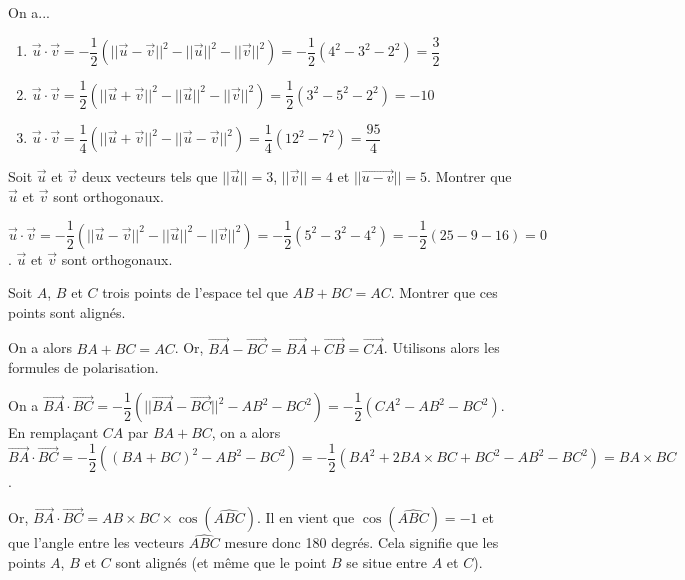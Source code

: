 \documentclass[11pt,fleqn, openany]{book} %
\begin{document}
\begin{solution} On a...
\begin{enumerate}
\item $\vec{u} \cdot \vec{v}= -\dfrac{1}{2}(\lvert\lvert\vec{u}-\vec{v}\rvert\rvert^2-\lvert\lvert\vec{u}\rvert\rvert^2-\lvert\lvert\vec{v}\rvert\rvert^2)=-\dfrac{1}{2}(4^2-3^2-2^2)=\dfrac{3}{2}$
\vskip5pt
\item $\vec{u} \cdot \vec{v}= \dfrac{1}{2}(\lvert\lvert\vec{u}+\vec{v}\rvert\rvert^2-\lvert\lvert\vec{u}\rvert\rvert^2-\lvert\lvert\vec{v}\rvert\rvert^2)=\dfrac{1}{2}(3^2-5^2-2^2)=-10$
\vskip5pt
\item $\vec{u} \cdot \vec{v} = \dfrac{1}{4}( \lvert\lvert\vec{u}+\vec{v}\rvert\rvert^2-\lvert\lvert\vec{u}-\vec{v}\rvert\rvert^2 )=\dfrac{1}{4}(12^2-7^2)=\dfrac{95}{4}$
\end{enumerate}\end{solution}



\begin{exercise}[topic=geom11]Soit $\vec u$ et $\vec v$ deux vecteurs tels que $\lvert\lvert\vec{u}\rvert\rvert=3$, $\lvert\lvert\vec{v}\rvert\rvert=4$ et $\lvert\lvert\vec{u-v}\rvert\rvert=5$. Montrer que $\vec u$ et $\vec v$ sont orthogonaux.\end{exercise}

\begin{solution}$\vec u \cdot \vec v = -\dfrac{1}{2}(\lvert\lvert\vec{u}-\vec{v}\rvert\rvert^2-\lvert\lvert\vec{u}\rvert\rvert^2-\lvert\lvert\vec{v}\rvert\rvert^2)=-\dfrac{1}{2}(5^2-3^2-4^2)=-\dfrac{1}{2}(25-9-16)=0$. $\vec u$ et $\vec v$ sont orthogonaux.\end{solution}




\begin{exercise}[topic=geom11]Soit $A$, $B$ et $C$ trois points de l'espace tel que $AB+BC=AC$. Montrer que ces points sont alignés.\end{exercise}

\begin{solution}On a alors $BA + BC = AC$. Or, $\overrightarrow{BA}-\overrightarrow{BC}=\overrightarrow{BA}+\overrightarrow{CB}=\overrightarrow{CA}$. Utilisons alors les formules de polarisation.

On a $\overrightarrow{BA}\cdot\overrightarrow{BC}=-\dfrac{1}{2}(\lvert\lvert\overrightarrow{BA}-\overrightarrow{BC}\rvert\rvert^2-AB^2-BC^2)=-\dfrac{1}{2}(CA^2-AB^2-BC^2)$. En remplaçant $CA$ par $BA+BC$, on a alors $\overrightarrow{BA} \cdot \overrightarrow{BC} = -\dfrac{1}{2}((BA+BC)^2-AB^2-BC^2)=-\dfrac{1}{2}(BA^2+2BA \times BC+BC^2-AB^2-BC^2)=BA \times BC$.

Or, $\overrightarrow{BA} \cdot \overrightarrow{BC} = AB \times BC \times \cos (\widehat{ABC})$. Il en vient que $\cos (\widehat{ABC})=-1$ et que l'angle entre les vecteurs $\widehat{ABC}$ mesure donc 180 degrés. Cela signifie que les points $A$, $B$ et $C$ sont alignés (et même que le point $B$ se situe entre $A$ et $C$).\end{solution}
\end{document}
